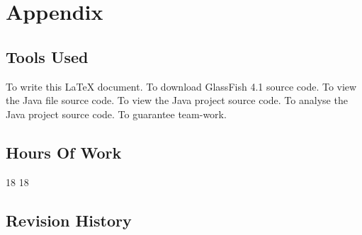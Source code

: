 \section{Appendix}
%
\subsection{Tools Used}
\begin{enumerate}
	 To write this \LaTeX{} document.
	 To download GlassFish 4.1 source code.
	 To view the Java file source code.
	 To view the Java project source code.
	 To analyse the Java project source code.
	 To guarantee team-work.
\end{enumerate}
%
%
\subsection{Hours Of Work}
\begin{itemize}
	 18
	 18
\end{itemize}
%
\subsection{Revision History}
